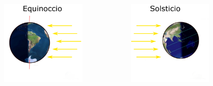 \documentclass{beamer}
\begin{document}
\begin{frame}
 \begin{columns}
  \begin{figure}
   \centering
   \includegraphics[scale=0.14]{Imagenes/Equinoccio}
  \end{figure}
\begin{figure}
   \centering
   \includegraphics[scale=0.14]{Imagenes/solsticio}
  \end{figure}
 \end{columns}
\end{frame}
\end{document}
